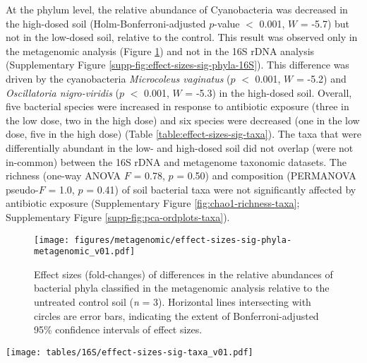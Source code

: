 At the phylum level, the relative abundance of Cyanobacteria was decreased in the high-dosed soil (Holm-Bonferroni-adjusted $p$-value $<$ 0.001, $W$ = -5.7) but not in the low-dosed soil, relative to the control.
This result was observed only in the metagenomic analysis (Figure \ref{fig:effect-sizes-sig-phyla-metagenomic}) and not in the 16S rDNA analysis (Supplementary Figure \ref{supp-fig:effect-sizes-sig-phyla-16S}).
This difference was driven by the cyanobacteria \textit{Microcoleus vaginatus} ($p$ $<$ 0.001, $W$ = -5.2) and \textit{Oscillatoria nigro-viridis} ($p$ $<$ 0.001, $W$ = -5.3) in the high-dosed soil.
Overall, five bacterial species were increased in response to antibiotic exposure (three in the low dose, two in the high dose) and six species were decreased (one in the low dose, five in the high dose) (Table \ref{table:effect-sizes-sig-taxa}).
The taxa that were differentially abundant in the low- and high-dosed soil did not overlap (were not in-common) between the 16S rDNA and metagenome taxonomic datasets.
The richness (one-way ANOVA $F$ = 0.78, $p$ = 0.50) and composition (PERMANOVA pseudo-$F$ = 1.0, $p$ = 0.41) of soil bacterial taxa were not significantly affected by antibiotic exposure (Supplementary Figure \ref{fig:chao1-richness-taxa}; Supplementary Figure \ref{supp-fig:pca-ordplots-taxa}).

\begin{figure}[htpb]
	\centering
		\texttt{[image: figures/metagenomic/effect-sizes-sig-phyla-metagenomic\_v01.pdf]}
	\caption[Effect sizes of bacterial phyla classified in the metagenomic analysis.]{
		Effect sizes (fold-changes) of differences in the relative abundances of bacterial phyla classified in the metagenomic analysis relative to the untreated control soil (\textit{n} = 3).
		Horizontal lines intersecting with circles are error bars, indicating the extent of Bonferroni-adjusted 95\% confidence intervals of effect sizes.
	}
	\label{fig:effect-sizes-sig-phyla-metagenomic}
\end{figure}

\begin{table}[htpb]
	\centering
		\texttt{[image: tables/16S/effect-sizes-sig-taxa\_v01.pdf]}
	\caption[Effect sizes of bacterial taxa classified in the 16S rDNA and metagenomic analyses.]{
		Effect sizes of differentially abundant soil bacterial taxa in response to macrolide antibiotic exposure at low (0.1 mg kg\textsuperscript{-1}) and high (10 mg kg\textsuperscript{-1}) doses, as identified by ANCOM-BC in the 16S rDNA analysis (16S) or metagenomic analysis (M). No taxa were identified as differentially abundant by both analyses.
	}
	\label{table:effect-sizes-sig-taxa}
\end{table}

